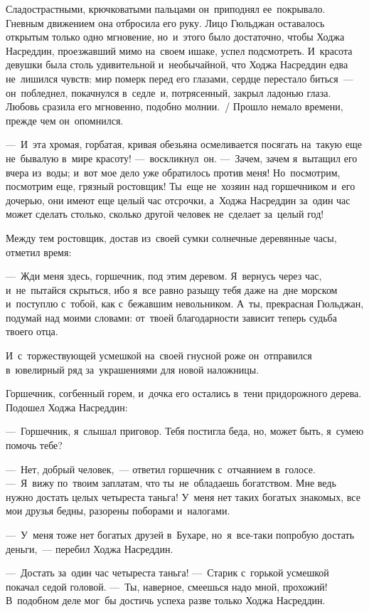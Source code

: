 \documentclass[12pt,a4paper]{book}
\begin{document}
Сладострастными, крючковатыми пальцами он~приподнял ее~покрывало. Гневным движением она отбросила его руку. Лицо Гюльджан оставалось открытым только одно мгновение, но~и~этого было достаточно, чтобы Ходжа Насреддин, проезжавший мимо на~своем ишаке, успел подсмотреть. И~красота девушки была столь удивительной и~необычайной, что Ходжа Насреддин едва не~лишился чувств: мир померк перед его глазами, сердце перестало биться~— он~побледнел, покачнулся в~седле~и, потрясенный, закрыл ладонью глаза. Любовь сразила его мгновенно, подобно молнии.~/ Прошло немало времени, прежде чем он~опомнился.

—~И~эта хромая, горбатая, кривая обезьяна осмеливается посягать на~такую еще не~бывалую в~мире красоту! —~воскликнул~он. —~Зачем, зачем я~вытащил его вчера из~воды; и~вот мое дело уже обратилось против меня! Но~посмотрим, посмотрим еще, грязный ростовщик! Ты~еще не~хозяин над горшечником и~его дочерью, они имеют еще целый час отсрочки, а~Ходжа Насреддин за~один час может сделать столько, сколько другой человек не~сделает за~целый год!

Между тем ростовщик, достав из~своей сумки солнечные деревянные часы, отметил время:

—~Жди меня здесь, горшечник, под этим деревом. Я~вернусь через час, и~не~пытайся скрыться, ибо я~все равно разыщу тебя даже на~дне морском и~поступлю с~тобой, как с~бежавшим невольником. А~ты, прекрасная Гюльджан, подумай над моими словами: от~твоей благодарности зависит теперь судьба твоего отца.

И~с~торжествующей усмешкой на~своей гнусной роже он~отправился в~ювелирный ряд за~украшениями для новой наложницы.

Горшечник, согбенный горем, и~дочка его остались в~тени придорожного дерева. Подошел Ходжа Насреддин:

—~Горшечник, я~слышал приговор. Тебя постигла беда, но, может быть, я~сумею помочь тебе?

—~Нет, добрый человек,~— ответил горшечник с~отчаянием в~голосе. —~Я~вижу по~твоим заплатам, что ты~не~обладаешь богатством. Мне ведь нужно достать целых четыреста таньга! У~меня нет таких богатых знакомых, все мои друзья бедны, разорены поборами и~налогами.

—~У~меня тоже нет богатых друзей в~Бухаре, но~я~все-таки попробую достать деньги,~— перебил Ходжа Насреддин.

—~Достать за~один час четыреста таньга! —~Старик с~горькой усмешкой покачал седой головой. —~Ты, наверное, смеешься надо мной, прохожий! В~подобном деле мог~бы достичь успеха разве только Ходжа Насреддин.
\end{document}

